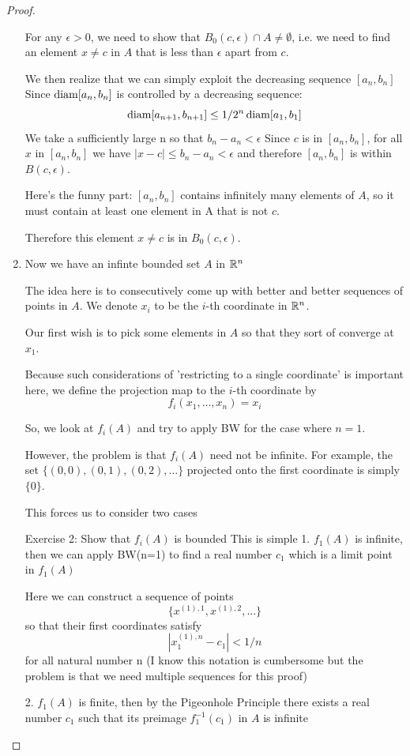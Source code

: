 \begin{proof}
\begin{enumerate}
For any $\epsilon>0$, we need to show that $B_0(c,\epsilon) \cap A \neq \emptyset$, i.e. we need to find an element $x \neq c$ in $A$ that is less than $\epsilon$ apart from $c$.

We then realize that we can simply exploit the decreasing sequence $[a_n,b_n]$
Since $\operatorname{diam} [a_n,b_n]$ is controlled by a decreasing sequence:
\[ \operatorname{diam} [a_{n+1},b_{n+1}] \le 1/2^n \operatorname{diam} [a_1,b_1] \]
We take a sufficiently large n so that $b_n-a_n<\epsilon$
Since $c$ is in $[a_n,b_n]$, for all $x$ in $[a_n,b_n]$ we have $|x-c|\le b_n-a_n<\epsilon$ and therefore $[a_n,b_n]$ is within $B(c,\epsilon)$.

Here's the funny part: $[a_n,b_n]$ contains infinitely many elements of $A$, so it must contain at least one element in A that is not $c$.

Therefore this element $x \neq c$ is in $B_0(c,\epsilon)$.

\item Now we have an infinte bounded set $A$ in $\mathbb R^n$

The idea here is to consecutively come up with better and better sequences of points in $A$. We denote $x_i$ to be the $i$-th coordinate in $\mathbb R^n$.

Our first wish is to pick some elements in $A$ so that they sort of converge at $x_1$.

Because such considerations of 'restricting to a single coordinate' is important here, we define the projection map to the $i$-th coordinate by
\[ f_i(x_1,\dots,x_n)=x_i \]

So, we look at $f_i(A)$ and try to apply BW for the case where $n=1$.

However, the problem is that $f_i(A)$ need not be infinite. For example, the set $\{(0,0),(0,1),(0,2),\dots\}$ projected onto the first coordinate is simply $\{0\}$.

This forces us to consider two cases

Exercise 2: Show that $f_i(A)$ is bounded
This is simple
1. $f_1(A)$ is infinite, then we can apply BW(n=1) to find a real number $c_1$ which is a limit point in $f_1(A)$

Here we can construct a sequence of points 
\[ \{x^{(1),1},x^{(1),2},...\} \]
so that their first coordinates satisfy
\[ |x^{(1),n}_1-c_1| < 1/n \]
for all natural number n
(I know this notation is cumbersome but the problem is that we need multiple sequences for this proof)

2. $f_1(A)$ is finite, then by the Pigeonhole Principle there exists a real number $c_1$ such that its preimage $f_1^{-1}(c_1)$ in $A$ is infinite


\end{enumerate}
\end{proof}

